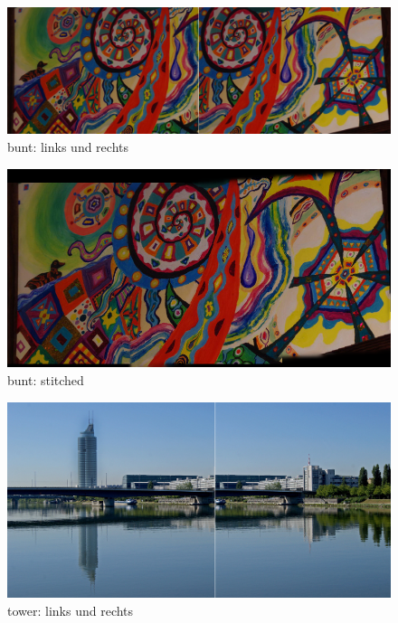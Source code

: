 \documentclass[deutsch]{scrartcl}
\begin{document}
\begin{figure}
\begin{center}
\includegraphics[width=1.0\textwidth]{bunt.jpg}
\caption{bunt: links und rechts}
\label{fig:bunt}
\end{center}
\end{figure}

\begin{figure}
\begin{center}
\includegraphics[width=1.0\textwidth]{buntS.png}
\caption{bunt: stitched}
\label{fig:buntS}
\end{center}
\end{figure}

\begin{figure}
\begin{center}
\includegraphics[width=1.0\textwidth]{tower.jpg}
\caption{tower: links und rechts}
\label{fig:tower}
\end{center}
\end{figure}
\end{document}
